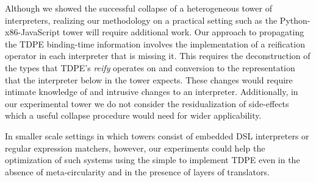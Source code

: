 \documentclass[a4paper,12pt,twoside,openright]{report}
\theoremstyle{definition}
\begin{document}
Although we showed the successful collapse of a heterogeneous tower of interpreters, realizing our methodology on a practical setting such as the Python-x86-JavaScript tower will require additional work. Our approach to propagating the TDPE binding-time information involves the implementation of a reification operator in each interpreter that is missing it. This requires the deconstruction of the types that TDPE's \textit{reify} operates on and conversion to the representation that the interpreter below in the tower expects. These changes would require intimate knowledge of and intrusive changes to an interpreter. Additionally, in our experimental tower we do not consider the residualization of side-effects which a useful collapse procedure would need for wider applicability.


In smaller scale settings in which towers consist of embedded DSL interpreters or regular expression matchers, however, our experiments could help the optimization of such systems using the simple to implement TDPE even in the absence of meta-circularity and in the presence of layers of translators.
\end{document}
